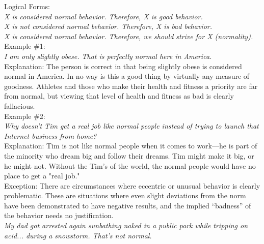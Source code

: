 \documentclass[a4paper,12pt,single,pdftex]{scrbook}
\begin{document}
    
      Logical Forms:
    \\

    
      {\em X is considered normal behavior. \newline
Therefore, X is good behavior.}
    \\

    
      {\em X is not considered normal behavior. \newline
Therefore, X is bad behavior.}
    \\

    
      {\em X is considered normal behavior. \newline
Therefore, we should strive for X (normality).}
    \\

    
      Example \#1:
    \\

    
      {\em I am only slightly obese.  That is perfectly normal here in America.}
    \\

    
      Explanation:  The person is correct in that being slightly obese is considered normal in America.  In no way is this a good thing by virtually any measure of goodness.  Athletes and those who make their health and fitness a priority are far from normal, but viewing that level of health and fitness as bad is clearly fallacious.
    \\

    
      Example \#2:
    \\

    
      {\em Why doesn't Tim get a real job like normal people instead of trying to launch that Internet business from home?}
    \\

    
      Explanation:  Tim is not like normal people when it comes to work—he is part of the minority who dream big and follow their dreams.  Tim might make it big, or he might not.  Without the Tim's of the world, the normal people would have no place to get a "real job."
    \\

    
      Exception: There are circumstances where eccentric or unusual behavior is clearly problematic. These are situations where even slight deviations from the norm have been demonstrated to have negative results, and the implied “badness” of the behavior needs no justification.
    \\

    
      {\em My dad got arrested again sunbathing naked in a public park while tripping on acid... during a snowstorm. That’s not normal.}
    \\
\end{document}
